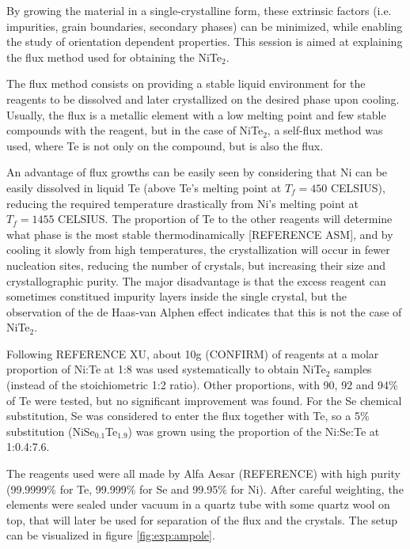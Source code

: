 \documentclass[prd,amsfonts,onecolumn,superscriptaddress,aps,nofootinbib,11pt]{revtex4}
\begin{document}
By growing the material in a single-crystalline form, these extrinsic factors (i.e. impurities, grain boundaries, secondary phases) can be minimized, while enabling the study of orientation dependent properties. This session is aimed at explaining the flux method used for obtaining the NiTe$_2$.

The flux method consists on providing a stable liquid environment for the reagents to be dissolved and later crystallized on the desired phase upon cooling. Usually, the flux is a metallic element with a low melting point and few stable compounds with the reagent, but in the case of NiTe$_2$, a self-flux method was used, where Te is not only on the compound, but is also the flux.

An advantage of flux growths can be easily seen by considering that Ni can be easily dissolved in liquid Te (above Te's melting point at $T_f = 450 $ CELSIUS), reducing the required temperature drastically from Ni's melting point at $T_f = 1455$ CELSIUS. The proportion of Te to the other reagents will determine what phase is the most stable thermodinamically [REFERENCE ASM], and by cooling it slowly from high temperatures, the crystallization will occur in fewer nucleation sites, reducing the number of crystals, but increasing their size and crystallographic purity. The major disadvantage is that the excess reagent can sometimes constitued impurity layers inside the single crystal, but the observation of the de Haas-van Alphen effect indicates that this is not the case of NiTe$_2$. 


Following REFERENCE XU, about 10g (CONFIRM) of reagents at a molar proportion of Ni:Te at 1:8 was used systematically to obtain NiTe$_2$ samples (instead of the stoichiometric 1:2 ratio). Other proportions, with 90, 92 and 94\% of Te were tested, but no significant improvement was found. For the Se chemical substitution, Se was considered to enter the flux together with Te, so a 5\% substitution (NiSe$_{0.1}$Te$_{1.9}$) was grown using the proportion of the Ni:Se:Te at 1:0.4:7.6.

The reagents used were all made by Alfa Aesar (REFERENCE) with high purity (99.9999\% for Te, 99.999\% for Se and 99.95\% for Ni). After careful weighting, the elements were sealed under vacuum in a quartz tube with some quartz wool on top, that will later be used for separation of the flux and the crystals. The setup can be visualized in figure \ref{fig:exp:ampole}.
\end{document}
